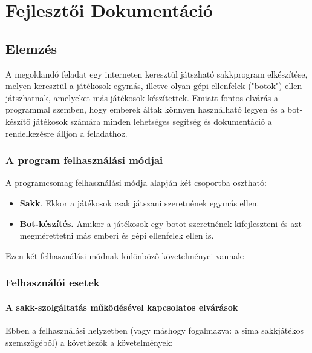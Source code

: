 \documentclass[twoside, a4paper, 12pt]{book}
\begin{document}
\newpage
\part{Fejlesztői Dokumentáció}
\chapter{Elemzés}
A megoldandó feladat egy interneten keresztül játszható sakkprogram elkészítése, melyen keresztül a játékosok egymás, illetve olyan gépi ellenfelek ("botok") ellen játszhatnak, amelyeket más játékosok készítettek. Emiatt fontos elvárás a programmal szemben, hogy emberek áltak könnyen használható legyen és a bot-készítő játékosok számára minden lehetséges segítség és dokumentáció a rendelkezésre álljon a feladathoz.

\section{A program felhasználási módjai}
A programcsomag felhasználási módja alapján két csoportba osztható:
\begin{itemize}
	\item \textbf{Sakk}. Ekkor a játékosok csak játszani szeretnének egymás ellen.
	
	\item \textbf{Bot-készítés.} Amikor a játékosok egy botot szeretnének kifejleszteni és azt megmérettetni más emberi és gépi ellenfelek ellen is.
\end{itemize}

Ezen két felhasználási-módnak különböző követelményei vannak:

\section{Felhasználói esetek}
\subsection{A sakk-szolgáltatás működésével kapcsolatos elvárások}
Ebben a felhasználási helyzetben (vagy máshogy fogalmazva: a sima sakkjátékos szemszögéből) a következők a követelmények:
\end{document}
